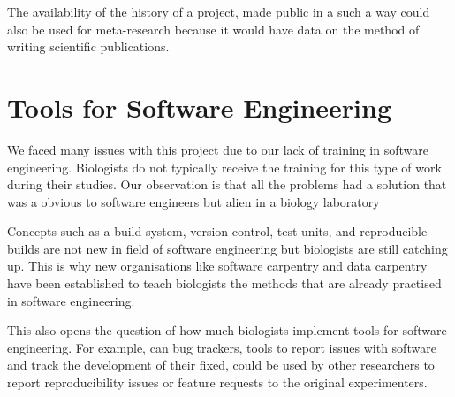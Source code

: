 The availability of the history of a project, made public in a such a
way could also be used for meta-research because it would have data on the
method of writing scientific publications.

\section{Tools for Software Engineering}

We faced many issues with this project due to our lack of training in
software engineering.  Biologists do not typically receive the training for this
type of work during their studies.  Our observation is that all the
problems had a solution that was a obvious to software engineers but
alien in a biology laboratory

Concepts such as a build system, version control, test units,
and reproducible builds are not new in field of software engineering but
biologists are still catching up.  This is why new
organisations like software carpentry and data carpentry have been
established to teach biologists the
methods that are already practised in software engineering.

This also opens the question of how much biologists implement
tools for software engineering.  For example, can
bug trackers, tools to report issues with software and track the
development of their fixed, could be used by other researchers to report
reproducibility issues or feature requests to the original experimenters.

